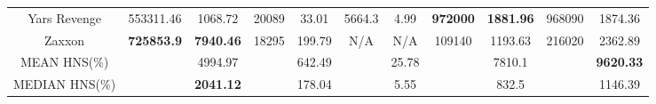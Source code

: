 \documentclass[nohyperref]{article}
\def\GDIHmeanhns{9620.33}
\def\GDIHmedianhns{1146.39}
\def\GDIImeanhns{7810.1}
\def\GDIImedianhns{832.5}
\def\muzeromeanhns{4994.97}
\def\muzeromedianhns{2041.12}
\def\dreamermeanhns{642.49}
\def\dreamermedianhns{178.04}
\def\simplemeanhns{25.78}
\def\simplemedianhns{5.55}
\newcommand{\best}[1]{\textbf{#1}}
\theoremstyle{plain}
\begin{document}
\begin{table}[!hb]
\begin{center}
\begin{tabular}{|c |c c| c c| c c| c c| c c|}
 Yars Revenge       & 553311.46             & 1068.72      & 20089    &33.01       & 5664.3   & 4.99    & \best{972000}      & \best{1881.96}                 &968090          &1874.36\\
 Zaxxon             & \textbf{725853.9}       & \textbf{7940.46}      & 18295    &199.79      & N/A      & N/A     & 109140      & 1193.63                    &216020	          &2362.89\\
\hline    
MEAN HNS(\%)        &                & \muzeromeanhns     &           &  \dreamermeanhns   &           &\simplemeanhns    &             & \GDIImeanhns&      & \textbf{\GDIHmeanhns} \\
\hline
MEDIAN HNS(\%)      &                & \textbf{\muzeromedianhns}      &           & \dreamermedianhns    &           & \simplemedianhns    &             & \GDIImedianhns &      & \GDIHmedianhns \\
\hline
\end{tabular}
\end{center}
\end{table}
\clearpage
\end{document}

